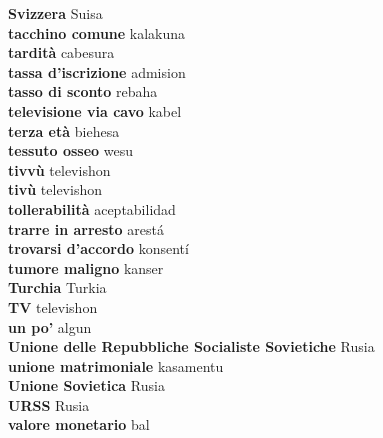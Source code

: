 \textbf{ Svizzera  } Suisa \\
\textbf{ tacchino comune  } kalakuna \\
\textbf{ tardità  } cabesura \\
\textbf{ tassa d’iscrizione  } admision \\
\textbf{ tasso di sconto  } rebaha \\
\textbf{ televisione via cavo  } kabel \\
\textbf{ terza età  } biehesa \\
\textbf{ tessuto osseo  } wesu \\
\textbf{ tivvù  } televishon \\
\textbf{ tivù  } televishon \\
\textbf{ tollerabilità  } aceptabilidad \\
\textbf{ trarre in arresto  } arestá \\
\textbf{ trovarsi d’accordo  } konsentí \\
\textbf{ tumore maligno  } kanser \\
\textbf{ Turchia  } Turkia \\
\textbf{ TV  } televishon \\
\textbf{ un po’  } algun \\
\textbf{ Unione delle Repubbliche Socialiste Sovietiche  } Rusia \\
\textbf{ unione matrimoniale  } kasamentu \\
\textbf{ Unione Sovietica  } Rusia \\
\textbf{ URSS  } Rusia \\
\textbf{ valore monetario  } bal \\

